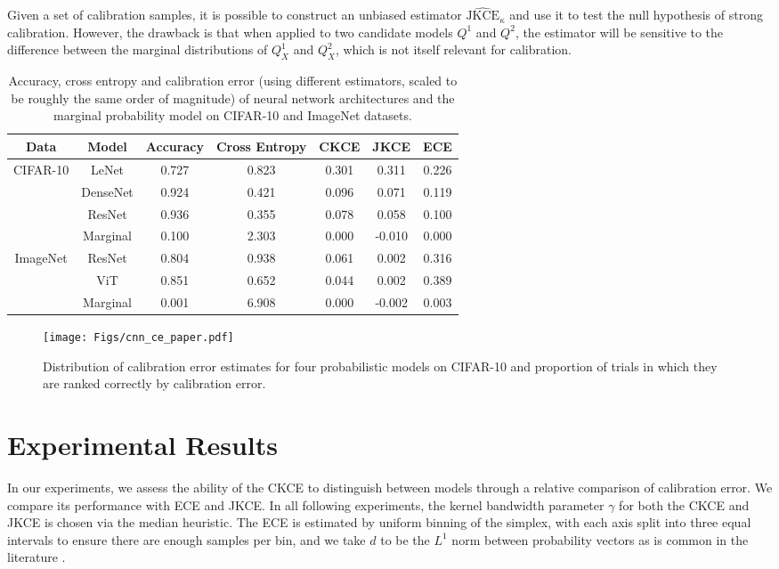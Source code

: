 \documentclass[twocolumn]{article}
\theoremstyle{definition}
\begin{document}
Given a set of calibration samples, it is possible to construct an unbiased estimator $\widehat{\text{JKCE}}_\kappa$ \citep{Widmann_2021} and use it to test the null hypothesis of strong calibration. However, the drawback is that when applied to two candidate models $Q^1$ and $Q^2$, the estimator will be sensitive to the difference between the marginal distributions of $Q^1_X$ and $Q^2_X$, which is not itself relevant for calibration. 

\begin{table*}[ht]
    \centering
    \caption{Accuracy, cross entropy and calibration error (using different estimators, scaled to be roughly the same order of magnitude) of neural network architectures and the marginal probability model on CIFAR-10 and ImageNet datasets.}
    \begin{tabular}{cc|ccccc}
    \toprule
Data & Model & Accuracy & Cross Entropy & CKCE & JKCE & ECE \\ \hline
\multirow{4}{*}{CIFAR-10} & LeNet & 0.727 & 0.823 & 0.301 & 0.311 & 0.226 \\
& DenseNet & 0.924 & 0.421 & 0.096 & 0.071 & 0.119 \\
& ResNet & 0.936 & 0.355 & 0.078 & 0.058 & 0.100 \\
& Marginal & 0.100 & 2.303 & 0.000 & -0.010 & 0.000 \\ \hline 
\multirow{3}{*}{ImageNet} & ResNet & 0.804 & 0.938 & 0.061 & 0.002 & 0.316 \\
 & ViT & 0.851 & 0.652 & 0.044 & 0.002 & 0.389 \\
 & Marginal & 0.001 & 6.908 & 0.000 & -0.002 & 0.003 \\
\bottomrule
    \end{tabular}
    \label{tab:nn_calibration}
\end{table*}

\begin{figure*}[ht]
    \centering
    \texttt{[image: Figs/cnn\_ce\_paper.pdf]}
    \caption{Distribution of calibration error estimates for four probabilistic models on CIFAR-10 and proportion of trials in which they are ranked correctly by calibration error.}
    \label{fig:ce_distribution}
\end{figure*}

\section{Experimental Results} \label{sec:experiments}

In our experiments, we assess the ability of the CKCE to distinguish between models through a relative comparison of calibration error. We compare its performance with ECE and JKCE. In all following experiments, the kernel bandwidth parameter $\gamma$ for both the CKCE and JKCE is chosen via the median heuristic. The ECE is estimated by uniform binning of the simplex, with each axis split into three equal intervals to ensure there are enough samples per bin, and we take $d$ to be the $L^1$ norm between probability vectors as is common in the literature \cite{Guo_2017, vaicenavicius_2019}.
\end{document}
